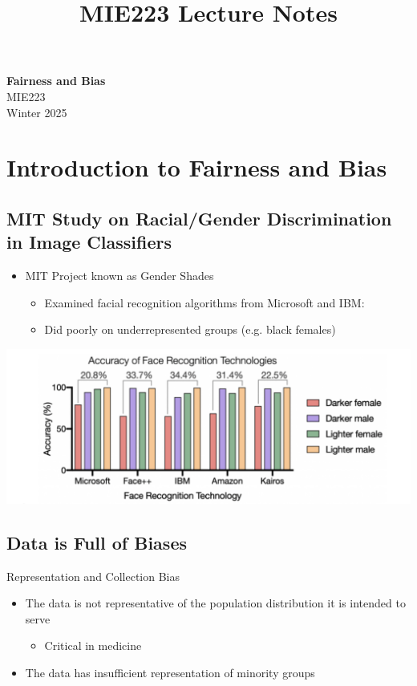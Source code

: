 \documentclass[11pt]{article}
\theoremstyle{definition}
\begin{document}
\setcounter{section}{0}
\title{MIE223 Lecture Notes}

\thispagestyle{empty}

\begin{center}
{\LARGE \bf Fairness and Bias}\\
{\large MIE223}\\
Winter 2025
\end{center}
\section{Introduction to Fairness and Bias}
\subsection{MIT Study on Racial/Gender Discrimination in Image Classifiers}
\begin{itemize}
    \item MIT Project known as Gender Shades
    \begin{itemize}
        \item Examined facial recognition algorithms from Microsoft and IBM:
        \item Did poorly on underrepresented groups (e.g. black females)
    \end{itemize}
\end{itemize}
\includegraphics[width = \textwidth]{1.png}
\subsection{Data is Full of Biases}
Representation and Collection Bias
\begin{itemize}
    \item The data is not representative of the population distribution it is intended to serve
    \begin{itemize}
        \item Critical in medicine
    \end{itemize}
    \item The data has insufficient representation of minority groups
\end{itemize}
\end{document}
